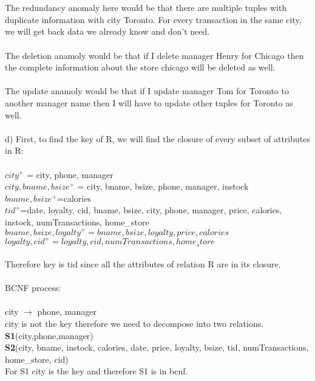 \documentclass{article}
\begin{document}
\begin{enumerate}
\begin{table}[h]
\begin{adjustbox}{width=1.1\textwidth}
\begin{tabular}{llllllllllllll}
			
		\end{tabular}
		\end{adjustbox}
		\end{table}
		\\\\
		The redundancy anomaly here would be that there are multiple tuples with duplicate information with city Toronto. For every transaction in the same city, we will get back data we already know and don't need.\\\\
		The deletion anamoly would be that if I delete manager Henry for Chicago then the complete information about the store chicago will be deleted as well.\\\\
		The update anamoly would be that if I update manager Tom for Toronto to another manager name then I will have to update other tuples for Toronto as well.
		\\\\
	d) First, to find the key of R, we will find the closure of every subset of attributes in R:\\\\
	$city^{+}$ = city, phone, manager\\
	  $city,bname,bsize^{+}$ = city, bname, bsize, phone, manager, instock\\
	  $bname,bsize^{+}$=calories\\
	  $tid^{+}$=date, loyalty, cid, bname, bsize, city, phone, manager, price, calories, instock, numTransactions, home\_store\\
	  $bname,bsize,loyalty^{+}=bname,bsize,loyalty,price,calories$\\
	  $loyalty,cid^{+}=loyalty,cid,numTransactions,home_store$\\\\
	  Therefore key is tid since all the attributes of relation R are in its closure.\\\\
	  BCNF process:\\\\
	  city $\rightarrow$ phone, manager\\
	  city is not the key therefore we need to decompose into two relations.\\
	  \textbf{S1}(city,phone,manager)\\
	  \textbf{S2}(city, bname, instock, calories, date, price, loyalty, bsize, tid, numTransactions, home\_store, cid)\\
	  For S1 city is the key and therefore S1 is in bcnf.\\

\end{enumerate}
\end{document}
